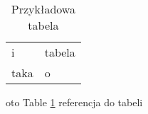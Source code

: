 \begin{table}
    \begin{tabular}{ll}
        i    & tabela \\
        taka & o     
    \end{tabular}
    \caption{Przykładowa tabela}
    \label{table:example}
\end{table}
oto Table \ref{table:example} referencja do tabeli